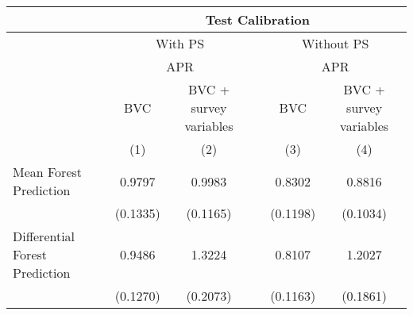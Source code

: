 \begin{tabular}{rccccc}
\toprule
      & \multicolumn{5}{c}{Test Calibration} \\
\midrule
      & \multicolumn{2}{c}{With PS} &       & \multicolumn{2}{c}{Without PS} \\
\cmidrule{2-3}\cmidrule{5-6}      & \multicolumn{2}{c}{APR} &       & \multicolumn{2}{c}{APR} \\
\cmidrule{2-3}\cmidrule{5-6}      & BVC   & BVC + survey variables &       & BVC   & BVC + survey variables \\
\midrule
      & (1)   & (2)   &       & (3)   & (4) \\
\midrule
\midrule
\multicolumn{1}{l}{Mean Forest Prediction} & 0.9797 & 0.9983 &       & 0.8302 & 0.8816 \\
      & (0.1335) & (0.1165) &       & (0.1198) & (0.1034) \\
\multicolumn{1}{l}{Differential Forest Prediction} & 0.9486 & 1.3224 &       & 0.8107 & 1.2027 \\
      & (0.1270) & (0.2073) &       & (0.1163) & (0.1861) \\
\bottomrule
\bottomrule
\end{tabular}%
